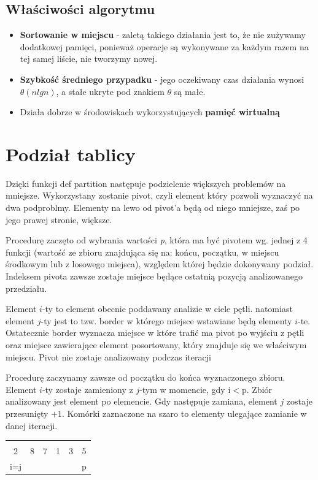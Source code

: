 \documentclass[a4paper,11pt]{report}
\begin{document}
\subsection*{Właściwości algorytmu}
\begin{itemize}
\item \textbf{Sortowanie w miejscu} - zaletą takiego działania jest to, że nie zużywamy dodatkowej pamięci, ponieważ operacje są wykonywane za każdym razem na tej samej liście, nie tworzymy nowej.
\item \textbf{Szybkość średniego przypadku} - jego oczekiwany czas działania wynosi $\theta(nlgn)$, a stałe ukryte pod znakiem $\theta$ są małe.
\item Działa dobrze w środowiskach wykorzystujących \textbf{pamięć wirtualną}
\end{itemize}
\newpage
\section{Podział tablicy}
Dzięki funkcji def partition następuje podzielenie większych problemów na mniejsze. Wykorzystany zostanie pivot, czyli element który pozwoli wyznaczyć na dwa podproblmy. Elementy na lewo od pivot'a będą od niego mniejsze, zaś po jego prawej stronie, większe.


Procedurę zaczęto od wybrania wartości \textit{p}, która ma być pivotem wg. jednej z 4 funkcji (wartość ze zbioru znajdująca się na: końcu, początku, w miejscu środkowym lub z losowego miejsca), względem której będzie dokonywany podział. Indeksem pivota zawsze zostaje miejsce będące ostatnią pozycją analizowanego przedziału.


Element $i$-ty to element obecnie poddawany analizie w ciele pętli. natomiast element $j$-ty jest to tzw. border 
w którego miejsce wstawiane będą elementy $i$-te. Ostatecznie border wyznacza miejsce w które trafić ma pivot po wyjściu z pętli oraz miejsce zawierające element posortowany, który znajduje się we właściwym miejscu. Pivot nie zostaje analizowany podczas iteracji


Procedurę zaczynamy zawsze od początku do końca wyznaczonego zbioru. Element $i$-ty zostaje zamieniony z $j$-tym w momencie, gdy i$<$p. Zbiór analizowany jest element po elemencie. Gdy następuje zamiana, element $j$ zostaje przesunięty $+1$. Komórki zaznaczone na szaro to elementy ulegające zamianie w danej iteracji.
\begin{table}[h!]
\Large
\centering
\begin{tabular}{|c|c|c|c|c|c|}
\hline
\cellcolor{black!25} &  &  &  &  & \\
\cellcolor{black!25}2 & 8 & 7 & 1 & 3 & 5 \\ \hdashline
i=j&  & &  &  & p\\ \hline
\end{tabular}

\end{table}
\end{document}
